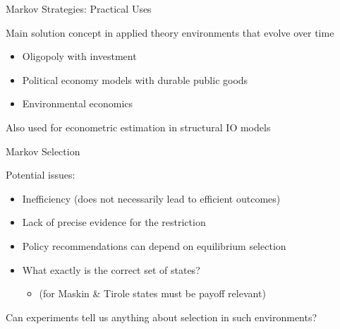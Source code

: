 \documentclass{beamer}
\begin{document}
\begin{frame}{Markov Strategies: Practical Uses}
    \begin{card}
    Main solution concept in applied theory environments that evolve over time
    \begin{itemize}
        \item Oligopoly with investment
        \item Political economy models with durable public goods
        \item Environmental economics
    \end{itemize}
    \end{card}
    \begin{card}
    Also used for econometric estimation in structural IO models
    \end{card}
\end{frame}



\begin{frame}{Markov Selection }
\begin{card}
    Potential issues:
    \begin{itemize}
    \item Inefficiency (does not necessarily lead to efficient outcomes)
    \item Lack of precise evidence for the restriction
    \item Policy recommendations can depend on equilibrium selection
    \item What exactly is the correct set of states?
        \begin{itemize}
        \item (for Maskin \& Tirole states must be payoff relevant)
        \end{itemize}
    \end{itemize}
\end{card}

\end{frame}

\begin{frame}
\begin{card}
 Can experiments tell us anything about selection in such environments?
\end{card}
\end{frame}
\end{document}
